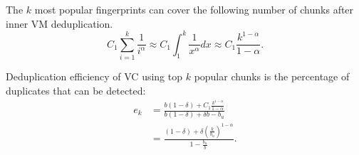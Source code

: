 
The  $k$ most popular fingerprints can cover the following number of chunks after inner VM 
deduplication.
\[
C_1 \sum_{i=1}^{k}\frac{1}{i^\alpha} \approx  
C_1 \int_{1}^{k}\frac{1}{x^\alpha} dx  \approx  C_1\frac{  k^{1-\alpha}} {1-\alpha}.
\]

Deduplication efficiency of VC using top $k$ popular chunks
is the percentage of duplicates that can be detected:  
\begin{equation}
\begin{split}
e_k &= 
\frac{ b(1-\delta) + C_1\frac{  k^{1-\alpha}} {1-\alpha}} 
{b(1-\delta)  + \delta b - b_u }\\
&= 
\frac{ (1-\delta) + \delta  (\frac{k}{b_u})^{1-\alpha}}
{ 1- \frac{b_u}{b} }.
\end{split}
\end{equation}






